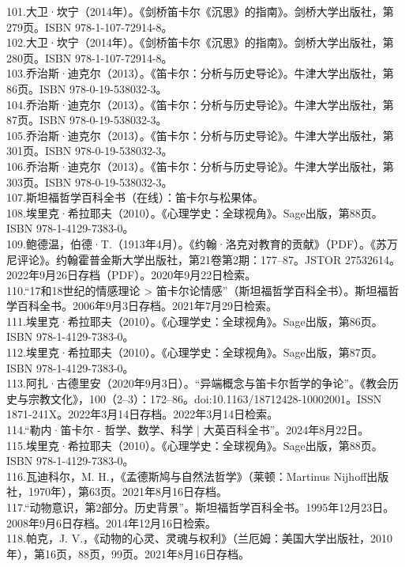 101.大卫·坎宁（2014年）。《剑桥笛卡尔《沉思》的指南》。剑桥大学出版社，第279页。ISBN 978-1-107-72914-8。\\
102.大卫·坎宁（2014年）。《剑桥笛卡尔《沉思》的指南》。剑桥大学出版社，第280页。ISBN 978-1-107-72914-8。\\
103.乔治斯·迪克尔（2013）。《笛卡尔：分析与历史导论》。牛津大学出版社，第86页。ISBN 978-0-19-538032-3。\\
104.乔治斯·迪克尔（2013）。《笛卡尔：分析与历史导论》。牛津大学出版社，第87页。ISBN 978-0-19-538032-3。\\
105.乔治斯·迪克尔（2013）。《笛卡尔：分析与历史导论》。牛津大学出版社，第301页。ISBN 978-0-19-538032-3。\\
106.乔治斯·迪克尔（2013）。《笛卡尔：分析与历史导论》。牛津大学出版社，第303页。ISBN 978-0-19-538032-3。\\
107.斯坦福哲学百科全书（在线）：笛卡尔与松果体。\\
108.埃里克·希拉耶夫（2010）。《心理学史：全球视角》。Sage出版，第88页。ISBN 978-1-4129-7383-0。\\
109.鲍德温，伯德·T.（1913年4月）。《约翰·洛克对教育的贡献》（PDF）。《苏万尼评论》。约翰霍普金斯大学出版社，第21卷第2期：177–87。JSTOR 27532614。2022年9月26日存档（PDF）。2020年9月22日检索。\\
110.“17和18世纪的情感理论 > 笛卡尔论情感”（斯坦福哲学百科全书）。斯坦福哲学百科全书。2006年9月3日存档。2021年7月29日检索。\\
111.埃里克·希拉耶夫（2010）。《心理学史：全球视角》。Sage出版，第86页。ISBN 978-1-4129-7383-0。\\
112.埃里克·希拉耶夫（2010）。《心理学史：全球视角》。Sage出版，第87页。ISBN 978-1-4129-7383-0。\\
113.阿扎·古德里安（2020年9月3日）。“异端概念与笛卡尔哲学的争论”。《教会历史与宗教文化》，100（2–3）：172–86。doi:10.1163/18712428-10002001。ISSN 1871-241X。2022年3月14日存档。2022年3月14日检索。\\
114.“勒内·笛卡尔 - 哲学、数学、科学 | 大英百科全书”。2024年8月22日。\\
115.埃里克·希拉耶夫（2010）。《心理学史：全球视角》。Sage出版，第88页。ISBN 978-1-4129-7383-0。\\
116.瓦迪科尔，M. H.，《孟德斯鸠与自然法哲学》（莱顿：Martinus Nijhoff出版社，1970年），第63页。2021年8月16日存档。\\
117.“动物意识，第2部分。历史背景”。斯坦福哲学百科全书。1995年12月23日。2008年9月6日存档。2014年12月16日检索。\\
118.帕克，J. V.，《动物的心灵、灵魂与权利》（兰厄姆：美国大学出版社，2010年），第16页，88页，99页。2021年8月16日存档。\\

